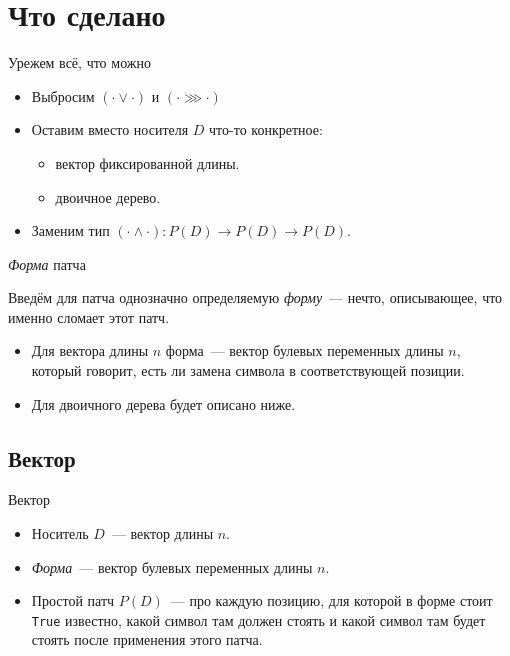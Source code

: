 \section{Что сделано}

\begin{frame}{Урежем всё, что можно}
  \begin{itemize}
  \item Выбросим $(\cdot \vee \cdot)$ и $(\cdot \ggg \cdot)$
  \item Оставим вместо носителя $D$ что-то конкретное:
    \begin{itemize}
    \item вектор фиксированной длины.
    \item двоичное дерево.
    \end{itemize}
  \item Заменим тип $(\cdot \wedge \cdot) : P(D) \to P(D) \to P(D)$.
  \end{itemize}
\end{frame}

\begin{frame}{\emph{Форма} патча}
  \begin{definition}
    Введём для патча однозначно определяемую \emph{форму}~--- нечто,
    описывающее, что именно сломает этот патч.
  \end{definition}
  
  \begin{itemize}
  \item Для вектора длины $n$ форма~--- вектор булевых переменных
    длины $n$, который говорит, есть ли замена символа в
    соответствующей позиции.
  \item Для двоичного дерева будет описано ниже.
  \end{itemize}
\end{frame}

\subsection{Вектор}

\begin{frame}{Вектор}
  \begin{itemize}
  \item Носитель $D$~--- вектор длины $n$.
  \item \emph{Форма}~--- вектор булевых переменных длины $n$.
  \item Простой патч $P(D)$~--- про каждую позицию, для которой в
    форме стоит \texttt{True} известно, какой символ там должен стоять
    и какой символ там будет стоять после применения этого патча.
  \end{itemize}
\end{frame}

